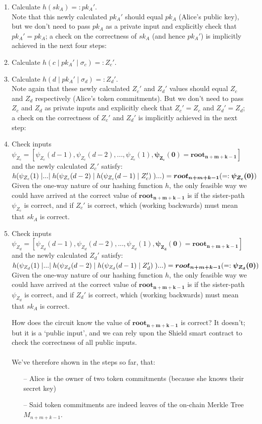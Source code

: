 \documentclass{article}
\DeclarePairedDelimiter\br{(}{)}
\begin{document}
\begin{enumerate}
  \item Calculate $h(sk_A) =: pk_A'$.\\
    Note that this newly calculated $pk_A'$ should equal $pk_A$ (Alice's public key), but we don't need to pass $pk_A$ as a private input and explicitly check that $pk_A'=pk_A$; a check on the correctness of $sk_A$ (and hence $pk_A'$) is implicitly achieved in the next four steps:
  \item Calculate $h(c\;|\;pk_A'\;|\;\sigma_c) =: Z_c'$.\\
  \item Calculate $h(d\;|\;pk_A'\;|\;\sigma_d) =: Z_d'$.\\
    Note again that these newly calculated $Z_c'$ and $Z_d'$ values should equal $Z_c$ and $Z_d$ respectively (Alice's token commitments). But we don't need to pass $Z_c$ and $Z_d$ as private inputs and explicitly check that $Z_c'=Z_c$ and $Z_d'=Z_d$; a check on the correctness of $Z_c'$ and $Z_d'$ is implicitly achieved in the next step:
  \item Check inputs $\psi_{Z_c}=[\psi_{Z_c}(d-1), \psi_{Z_c}(d-2),..., \psi_{Z_c}(1), \bm{\psi_{Z_c}(0)=root_{n+m+k-1}}]$ and the newly calculated $Z_c'$ satisfy:\\
    $h\br*{\psi_{Z_c}(1)\;|...|\;h\br*{\psi_{Z_c}(d-2)\;|\;h\br*{\psi_{Z_c}(d-1)\;|\;Z_c'}\;}...} = \bm{root_{n+m+k-1}} ( =: \bm{\psi_{Z_c}(0)})$\\
    Given the one-way nature of our hashing function $h$, the only feasible way we could have arrived at the correct value of $\bm{root_{n+m+k-1}}$ is if the sister-path $\psi_{Z_c}$ is correct, and if $Z_c'$ is correct, which (working backwards) must mean that $sk_A$ is correct.
  \item Check inputs $\psi_{Z_d}=[\psi_{Z_d}(d-1), \psi_{Z_d}(d-2),..., \psi_{Z_d}(1), \bm{\psi_{Z_d}(0)=root_{n+m+k-1}}]$ and the newly calculated $Z_d'$ satisfy:\\
    $h\br*{\psi_{Z_d}(1)\;|...|\;h\br*{\psi_{Z_d}(d-2)\;|\;h\br*{\psi_{Z_d}(d-1)\;|\;Z_d'}\;}...} = \bm{root_{n+m+k-1}} ( =: \bm{\psi_{Z_d}(0)})$\\
    Given the one-way nature of our hashing function $h$, the only feasible way we could have arrived at the correct value of $\bm{root_{n+m+k-1}}$ is if the sister-path $\psi_{Z_d}$ is correct, and if $Z_d'$ is correct, which (working backwards) must mean that $sk_A$ is correct.

    How does the circuit know the value of $\bm{root_{n+m+k-1}}$ is correct? It doesn't; but it is a `public input', and we can rely upon the Shield smart contract to check the correctness of all public inputs.\\
  \\
  We've therefore shown in the steps so far, that:
  \begin{itemize}
    \item[--] Alice is the owner of two token commitments (because she knows their secret key)
    \item[--] Said token commitments are indeed leaves of the on-chain Merkle Tree $M_{n+m+k-1}$.
  \end{itemize}


\end{enumerate}
\end{document}

